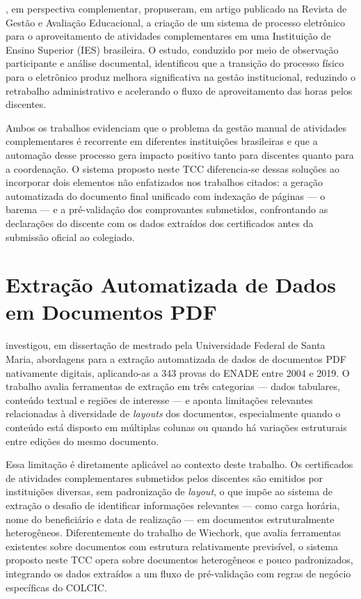 , em perspectiva complementar, propuseram, em 
artigo publicado na Revista de Gestão e Avaliação Educacional, a criação 
de um sistema de processo eletrônico para o aproveitamento de atividades 
complementares em uma Instituição de Ensino Superior (IES) brasileira. O estudo, conduzido por meio de 
observação participante e análise documental, 
identificou que a transição do processo físico para o eletrônico produz 
melhora significativa na gestão institucional, reduzindo o retrabalho 
administrativo e acelerando o fluxo de aproveitamento das horas pelos 
discentes.

Ambos os trabalhos evidenciam que o problema da gestão manual de 
atividades complementares é recorrente em diferentes instituições 
brasileiras e que a automação desse processo gera impacto positivo 
tanto para discentes quanto para a coordenação. O sistema proposto 
neste TCC diferencia-se dessas soluções ao incorporar dois elementos 
não enfatizados nos trabalhos citados: a geração automatizada do 
documento final unificado com indexação de páginas — o barema — e a 
pré-validação dos comprovantes submetidos, confrontando as declarações 
do discente com os dados extraídos dos certificados antes da submissão 
oficial ao colegiado.

\section{Extração Automatizada de Dados em Documentos PDF}

 investigou, em dissertação de mestrado pela Universidade 
Federal de Santa Maria, abordagens para a extração automatizada de dados 
de documentos PDF nativamente digitais, aplicando-as a 343 provas do 
ENADE entre 2004 e 2019. O trabalho avalia ferramentas de extração em 
três categorias — dados tabulares, conteúdo textual e regiões de interesse — 
e aponta limitações relevantes 
relacionadas à diversidade de \textit{layouts} dos documentos, especialmente 
quando o conteúdo está disposto em múltiplas colunas ou quando há 
variações estruturais entre edições do mesmo documento.

Essa limitação é diretamente aplicável ao contexto deste trabalho. 
Os certificados de atividades complementares submetidos pelos discentes 
são emitidos por instituições diversas, sem padronização de \textit{layout}, o 
que impõe ao sistema de extração o desafio de identificar informações 
relevantes — como carga horária, nome do beneficiário e data de 
realização — em documentos estruturalmente heterogêneos. Diferentemente 
do trabalho de Wiechork, que avalia ferramentas existentes sobre 
documentos com estrutura relativamente previsível, o sistema proposto 
neste TCC opera sobre documentos heterogêneos e pouco padronizados, 
integrando os dados extraídos a um fluxo de pré-validação com regras de 
negócio específicas do COLCIC.

